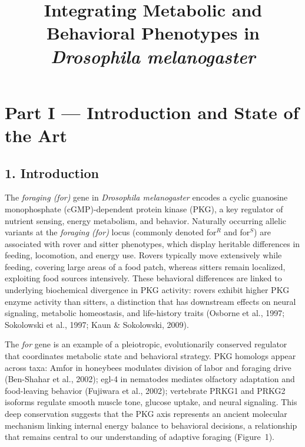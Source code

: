\documentclass[11pt]{article}
\title{Integrating Metabolic and Behavioral Phenotypes in \\ \emph{Drosophila melanogaster}}
\author{}
\date{}
\begin{document}
\maketitle

\section*{Part I --- Introduction and State of the Art}

\subsection*{1. Introduction}

The \emph{foraging (for)} gene in \emph{Drosophila melanogaster} encodes a cyclic guanosine monophosphate (cGMP)-dependent protein kinase (PKG), a key regulator of nutrient sensing, energy metabolism, and behavior. Naturally occurring allelic variants at the \emph{foraging (for)} locus (commonly denoted for$^R$ and for$^S$) are associated with rover and sitter phenotypes, which display heritable differences in feeding, locomotion, and energy use. Rovers typically move extensively while feeding, covering large areas of a food patch, whereas sitters remain localized, exploiting food sources intensively. These behavioral differences are linked to underlying biochemical divergence in PKG activity: rovers exhibit higher PKG enzyme activity than sitters, a distinction that has downstream effects on neural signaling, metabolic homeostasis, and life-history traits (Osborne et al., 1997; Sokolowski et al., 1997; Kaun \& Sokolowski, 2009).

The \emph{for} gene is an example of a pleiotropic, evolutionarily conserved regulator that coordinates metabolic state and behavioral strategy. PKG homologs appear across taxa: Amfor in honeybees modulates division of labor and foraging drive (Ben-Shahar et al., 2002); egl-4 in nematodes mediates olfactory adaptation and food-leaving behavior (Fujiwara et al., 2002); vertebrate PRKG1 and PRKG2 isoforms regulate smooth muscle tone, glucose uptake, and neural signaling. This deep conservation suggests that the PKG axis represents an ancient molecular mechanism linking internal energy balance to behavioral decisions, a relationship that remains central to our understanding of adaptive foraging (Figure~1).
\end{document}
